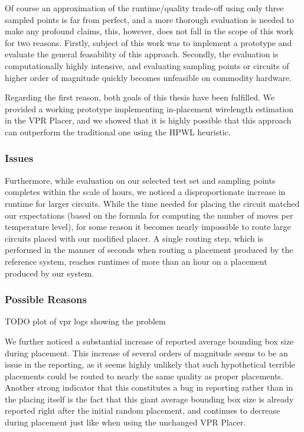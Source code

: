 Of course an approximation of the runtime/quality trade-off using only three sampled points is far from perfect, and a more thorough evaluation is needed to make any profound claims, this, however, does not fall in the scope of this work for two reasons. Firstly, subject of this work was to implement a prototype and evaluate the general feasability of this approach. Secondly, the evaluation is computationally highly intensive, and evaluating sampling points or circuits of higher order of magnitude quickly becomes unfeasible on commodity hardware.

Regarding the first reason, both goals of this thesis have been fulfilled. We provided a working prototype implementing in-placement wirelength estimation in the \gls{VPR} Placer, and we showed that it is highly possible that this approach can outperform the traditional one using the \gls{HPWL} heuristic.

\subsubsection{Issues}

Furthermore, while evaluation on our selected test set and sampling points completes within the scale of hours, we noticed a disproportionate increase in runtime for larger circuits. While the time needed for placing the circuit matched our expectations (based on the formula for computing the number of moves per temperature level), for some reason it becomes nearly impossible to route large circuits placed with our modified placer. A single routing step, which is performed in the manner of seconds when routing a placement produced by the reference system, reaches runtimes of more than an hour on a placement produced by our system.

\subsubsection{Possible Reasons}

TODO plot of vpr logs showing the problem

We further noticed a substantial increase of reported average bounding box size during placement. This increase of several orders of magnitude seems to be an issue in the reporting, as it seems highly unlikely that such hypothetical terrible placements could be routed to nearly the same quality as proper placements. Another strong indicator that this constitutes a bug in reporting rather than in the placing itself is the fact that this giant average bounding box size is already reported right after the initial random placement, and continues to decrease during placement just like when using the unchanged \gls{VPR} Placer.


